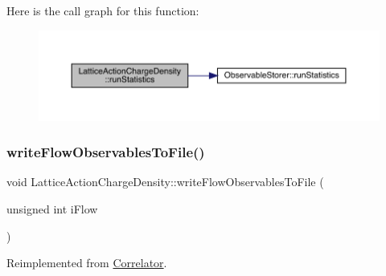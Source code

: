 Here is the call graph for this function\+:\nopagebreak
\begin{figure}[H]
\begin{center}
\leavevmode
\includegraphics[width=350pt]{class_lattice_action_charge_density_a21d608703811d2814e7f654588eaa0c0_cgraph}
\end{center}
\end{figure}
\mbox{\label{class_lattice_action_charge_density_a54226556dc1497c311e4a4d50bf44c26}} 
\subsubsection{\texorpdfstring{writeFlowObservablesToFile()}{writeFlowObservablesToFile()}}
{\footnotesize\ttfamily void Lattice\+Action\+Charge\+Density\+::write\+Flow\+Observables\+To\+File (\begin{DoxyParamCaption}\item[{unsigned int}]{i\+Flow }\end{DoxyParamCaption})\hspace{0.3cm}{\ttfamily [virtual]}}



Reimplemented from \mbox{\hyperlink{class_correlator_a168512b2ce182d9478db47f100125fa6}{Correlator}}.

